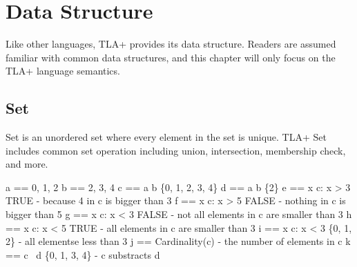 
% 

\chapter{Data Structure}

Like other languages, TLA+ provides its data structure. Readers are assumed
familiar with common data structures, and this chapter will only focus on the
TLA+ language semantics.

\section{Set}

Set is an unordered set where every element in the set is unique. TLA+ Set
includes common set operation including union, intersection, membership check,
and more.\newline

\begin{tla}
a == {0, 1, 2}
b == {2, 3, 4}
c == a \union b         \* \{0, 1, 2, 3, 4\}
d == a \intersect b     \* \{2\}
e == \E x \in c: x > 3  \* TRUE - because 4 in c is bigger than 3
f == \E x \in c: x > 5  \* FALSE - nothing in c is bigger than 5
g == \A x \in c: x < 3  \* FALSE - not all elements in c are smaller than 3
h == \A x \in c: x < 5  \* TRUE - all elements in c are smaller than 3
i == {x \in c: x < 3}   \* \{0, 1, 2\} - all elementse less than 3
j == Cardinality(c)      - the number of elements in c
k == c \ d              \* \{0, 1, 3, 4\} - c substracts d
\end{tla}
\begin{tlatex}
%
%
%
%
\@xx{}%
%
%
\@xx{}%
%
%
\@xx{}%
%
%
\@xx{}%
%
%
\@xx{}%
%
%
\@xx{}%
%
%
\@xx{}%
%
%
\@xx{}%
%
%
\@xx{}%
\end{tlatex}

